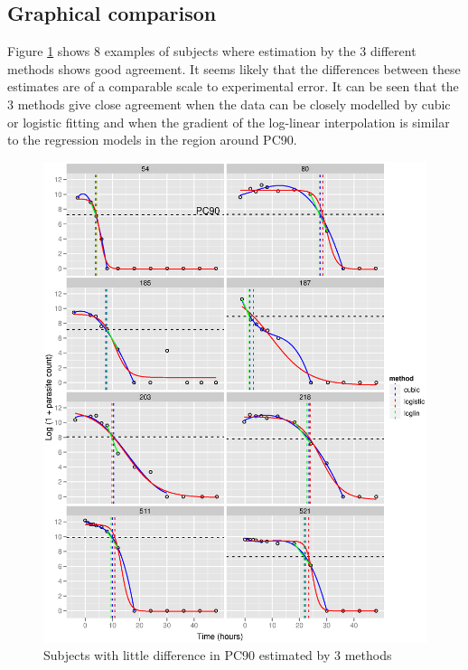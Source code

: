 \subsection{Graphical comparison}
Figure \ref{pc90-agree} shows 8 examples of subjects where estimation by the 3 different methods shows good agreement. It seems likely that the differences between these estimates are of a comparable scale to experimental error. It can be seen that the 3 methods give close agreement when the data can be closely modelled by cubic or logistic fitting and when the gradient of the log-linear interpolation is similar to the regression models in the region around PC90. 
\begin{figure}[h]
\includegraphics[width=6.5in]{pc90-agree.eps} 
\caption{Subjects with little difference in PC90 estimated by 3 methods}
\label{pc90-agree}
\end{figure}


